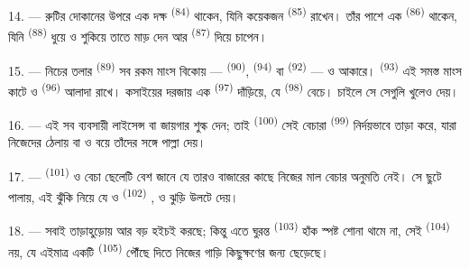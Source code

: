 14. --- রুটির দোকানের উপরে এক দক্ষ  \textsuperscript{(84)}
থাকেন, যিনি কয়েকজন  \textsuperscript{(85)} রাখেন। তাঁর
পাশে এক  \textsuperscript{(86)} থাকেন, যিনি
 \textsuperscript{(88)} ধুয়ে ও শুকিয়ে তাতে মাড় দেন আর
 \textsuperscript{(87)} দিয়ে চাপেন।

\VUsaut{4.0mm}
\VUsaut{3.0mm}

15. --- নিচের তলার  \textsuperscript{(89)} সব রকম মাংস
বিকোয় ---  \textsuperscript{(90)}, 
\textsuperscript{(94)} বা  \textsuperscript{(92)} ---  ও  আকারে। 
\textsuperscript{(93)} এই সমস্ত মাংস কাটে ও 
\textsuperscript{(96)} আলাদা রাখে। কসাইয়ের দরজায় এক 
\textsuperscript{(97)} দাঁড়িয়ে, যে  \textsuperscript{(98)} বেচে।
চাইলে সে সেগুলি খুলেও দেয়।

16. --- এই সব ব্যবসায়ী লাইসেন্স বা জায়গার শুল্ক দেন; তাই 
\textsuperscript{(100)} সেই বেচারা 
\textsuperscript{(99)} নির্দয়ভাবে তাড়া করে, যারা নিজেদের ঠেলায়  বা  ও  বয়ে তাঁদের সঙ্গে পাল্লা দেয়।

\VUsaut{4.0mm}
\VUsaut{3.0mm}

17. ---  \textsuperscript{(101)} ও  বেচা ছেলেটি বেশ
জানে যে তারও বাজারের কাছে নিজের মাল বেচার অনুমতি নেই। সে ছুটে পালায়, এই ঝুঁকি
নিয়ে যে  ও  
\textsuperscript{(102)} ,  ও  ঝুড়ি উলটে দেয়।

18. --- সবাই তাড়াহুড়োয় আর বড় হইচই করছে; কিন্তু এতে ঘুরন্ত
 \textsuperscript{(103)} হাঁক স্পষ্ট শোনা থামে না, সেই
 \textsuperscript{(104)} নয়, যে এইমাত্র একটি
 \textsuperscript{(105)} পৌঁছে দিতে নিজের গাড়ি কিছুক্ষণের
জন্য ছেড়েছে।
\VUsaut{6.0mm}
\VUfilet{22mm}
